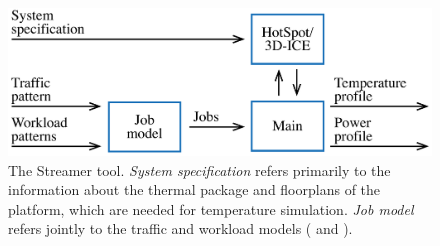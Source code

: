 \begin{figure}
  \centering
  \includegraphics[width=1.0\columnwidth]{include/assets/figures/streamer.pdf}

  \caption{The Streamer tool. \emph{System specification} refers primarily to
  the information about the thermal package and floorplans of the platform,
  which are needed for temperature simulation. \emph{Job model} refers jointly
  to the traffic and workload models ( and ).}

\end{figure}
